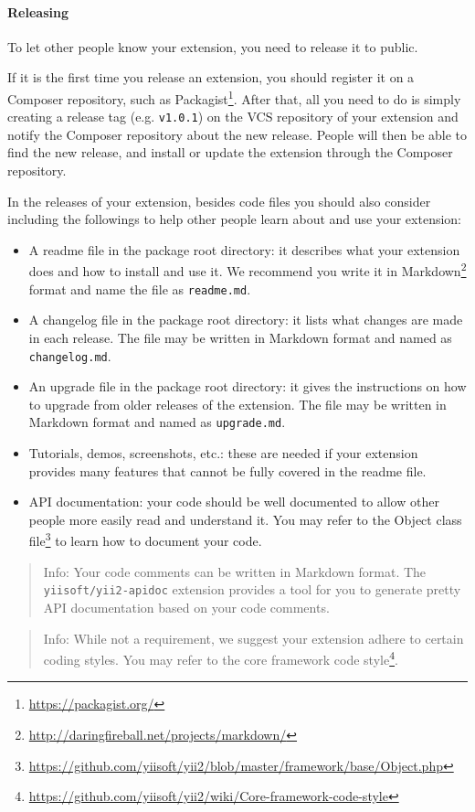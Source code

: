 \paragraph{Releasing \label{structure-extensions.md::releasing}}
To let other people know your extension, you need to release it to public.

If it is the first time you release an extension, you should register it on a Composer repository, such as
Packagist\footnote{\url{https://packagist.org/}}. After that, all you need to do is simply creating a release tag (e.g. \lstinline|v1.0.1|)
on the VCS repository of your extension and notify the Composer repository about the new release. People will
then be able to find the new release, and install or update the extension through the Composer repository.

In the releases of your extension, besides code files you should also consider including the followings to
help other people learn about and use your extension:

\begin{itemize}
\item A readme file in the package root directory: it describes what your extension does and how to install and use it.
We recommend you write it in Markdown\footnote{\url{http://daringfireball.net/projects/markdown/}} format and name the file
as \lstinline|readme.md|.
\item A changelog file in the package root directory: it lists what changes are made in each release. The file
may be written in Markdown format and named as \lstinline|changelog.md|.
\item An upgrade file in the package root directory: it gives the instructions on how to upgrade from older releases
of the extension. The file may be written in Markdown format and named as \lstinline|upgrade.md|.
\item Tutorials, demos, screenshots, etc.: these are needed if your extension provides many features that cannot be
fully covered in the readme file.
\item API documentation: your code should be well documented to allow other people more easily read and understand it.
You may refer to the Object class file\footnote{\url{https://github.com/yiisoft/yii2/blob/master/framework/base/Object.php}}
to learn how to document your code.
\end{itemize}
\begin{quote}Info: Your code comments can be written in Markdown format. The \lstinline|yiisoft/yii2-apidoc| extension provides a tool
  for you to generate pretty API documentation based on your code comments.

\end{quote}
\begin{quote}Info: While not a requirement, we suggest your extension adhere to certain coding styles. You may refer to
  the core framework code style\footnote{\url{https://github.com/yiisoft/yii2/wiki/Core-framework-code-style}}.

\end{quote}
